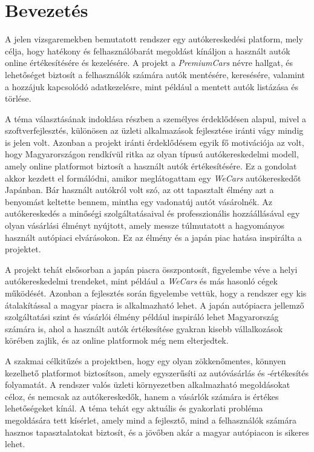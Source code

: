 \documentclass{report}[11pt]
\begin{document}
    \chapter{Bevezetés}

    A jelen vizsgaremekben bemutatott rendszer egy autókereskedési platform, mely célja, hogy hatékony és felhasználóbarát megoldást kínáljon a használt autók online értékesítésére és kezelésére. A projekt a \textit{PremiumCars} névre hallgat, és lehetőséget biztosít a felhasználók számára autók mentésére, keresésére, valamint a hozzájuk kapcsolódó adatkezelésre, mint például a mentett autók listázása és törlése.
    
    A téma választásának indoklása részben a személyes érdeklődésen alapul, mivel a szoftverfejlesztés, különösen az üzleti alkalmazások fejlesztése iránti vágy mindig is jelen volt. Azonban a projekt iránti érdeklődésem egyik fő motivációja az volt, hogy Magyarországon rendkívül ritka az olyan típusú autókereskedelmi modell, amely online platformot biztosít a használt autók értékesítésére. Ez a gondolat akkor kezdett el formálódni, amikor meglátogattam egy \textit{WeCars} autókereskedőt Japánban. Bár használt autókról volt szó, az ott tapasztalt élmény azt a benyomást keltette bennem, mintha egy vadonatúj autót vásárolnék. Az autókereskedés a minőségi szolgáltatásaival és professzionális hozzáállásával egy olyan vásárlási élményt nyújtott, amely messze túlmutatott a hagyományos használt autópiaci elvárásokon. Ez az élmény és a japán piac hatása inspirálta a projektet.
    
    A projekt tehát elsősorban a japán piacra összpontosít, figyelembe véve a helyi autókereskedelmi trendeket, mint például a \textit{WeCars} és más hasonló cégek működését. Azonban a fejlesztés során figyelembe vettük, hogy a rendszer egy kis átalakítással a magyar piacra is alkalmazható lehet. A japán autópiacra jellemző szolgáltatási szint és vásárlói élmény például inspiráló lehet Magyarország számára is, ahol a használt autók értékesítése gyakran kisebb vállalkozások körében zajlik, és az online platformok még nem elterjedtek.
    
    A szakmai célkitűzés a projektben, hogy egy olyan zökkenőmentes, könnyen kezelhető platformot biztosítson, amely egyszerűsíti az autóvásárlás és -értékesítés folyamatát. A rendszer valós üzleti környezetben alkalmazható megoldásokat céloz, és nemcsak az autókereskedők, hanem a vásárlók számára is értékes lehetőségeket kínál. A téma tehát egy aktuális és gyakorlati probléma megoldására tett kísérlet, amely mind a fejlesztő, mind a felhasználók számára hasznos tapasztalatokat biztosít, és a jövőben akár a magyar autópiacon is sikeres lehet.
    
\end{document}
